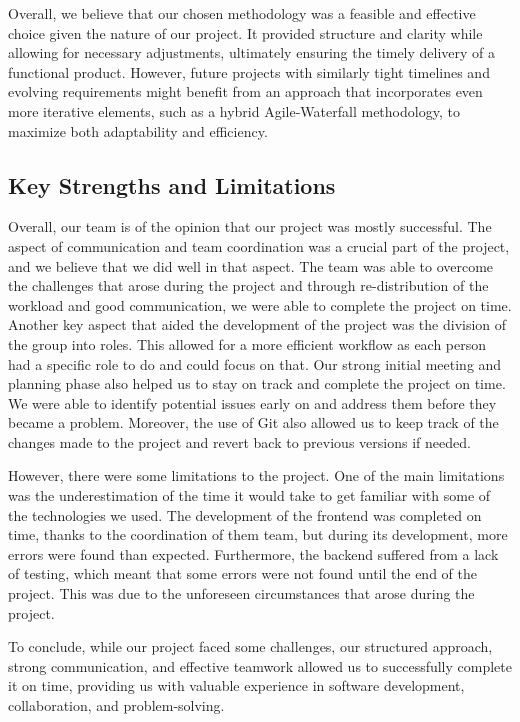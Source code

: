 \documentclass{article}
\begin{document}
    Overall, we believe that our chosen methodology was a feasible and effective choice given the nature of our project. It provided structure and clarity while allowing for necessary adjustments, ultimately ensuring the timely 
    delivery of a functional product. However, future projects with similarly tight timelines and evolving requirements might benefit from an approach that incorporates even more iterative elements, such as a hybrid Agile-Waterfall 
    methodology, to maximize both adaptability and efficiency.

    \subsection{Key Strengths and Limitations}

    Overall, our team is of the opinion that our project was mostly successful. The aspect of communication and team coordination was a crucial part of the project, and we believe that we did well in that aspect. The team was able to overcome the
    challenges that arose during the project and through re-distribution of the workload and good communication, we were able to complete the project on time. Another key aspect that aided the development of the project was the division of the group 
    into roles. This allowed for a more efficient workflow as each person had a specific role to do and could focus on that. Our strong initial meeting and planning phase also helped us to stay on track and complete the project on time. We were able to
    identify potential issues early on and address them before they became a problem. Moreover, the use of Git also allowed us to keep track of the changes made to the project and revert back to previous versions if needed.

    However, there were some limitations to the project. One of the main limitations was the underestimation of the time it would take to get familiar with some of the technologies we used. The development of the frontend was completed on time, thanks to the
    coordination of them team, but during its development, more errors were found than expected. Furthermore, the backend suffered from a lack of testing, which meant that some errors were not found until the end of the project. This was due to the unforeseen
    circumstances that arose during the project.

    To conclude, while our project faced some challenges, our structured approach, strong communication, and effective teamwork allowed us to successfully complete it on time, providing us with valuable experience in software development, collaboration, and 
    problem-solving.
\end{document}
